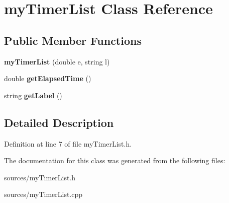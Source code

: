 \hypertarget{classmyTimerList}{\section{my\-Timer\-List Class Reference}
\label{classmyTimerList}
}
\subsection*{Public Member Functions}
\begin{DoxyCompactItemize}
\item 
\hypertarget{classmyTimerList_a60b5b7ca405e78a8130bb2cb7127a8d9}{{\bfseries my\-Timer\-List} (double e, string l)}\label{classmyTimerList_a60b5b7ca405e78a8130bb2cb7127a8d9}

\item 
\hypertarget{classmyTimerList_aff736b8c4da4f201f7ce0d237407bd7a}{double {\bfseries get\-Elapsed\-Time} ()}\label{classmyTimerList_aff736b8c4da4f201f7ce0d237407bd7a}

\item 
\hypertarget{classmyTimerList_a3034226d2cd0d90cb363fe52b76de6a9}{string {\bfseries get\-Label} ()}\label{classmyTimerList_a3034226d2cd0d90cb363fe52b76de6a9}

\end{DoxyCompactItemize}


\subsection{Detailed Description}


Definition at line 7 of file my\-Timer\-List.\-h.



The documentation for this class was generated from the following files\-:\begin{DoxyCompactItemize}
\item 
sources/my\-Timer\-List.\-h\item 
sources/my\-Timer\-List.\-cpp\end{DoxyCompactItemize}
